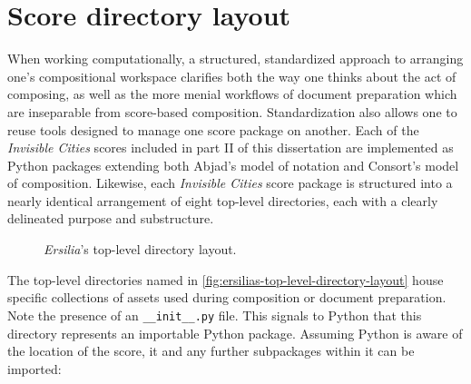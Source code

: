 \section{Score directory layout}

When working computationally, a structured, standardized approach to arranging
one's compositional workspace clarifies both the way one thinks about the act
of composing, as well as the more menial workflows of document preparation
which are inseparable from score-based composition. Standardization also allows
one to reuse tools designed to manage one score package on another. Each of the
\emph{Invisible Cities} scores included in part II of this dissertation are
implemented as Python packages extending both Abjad's model of notation and
Consort's model of composition. Likewise, each \emph{Invisible Cities} score
package is structured into a nearly identical arrangement of eight top-level
directories, each with a clearly delineated purpose and substructure.

\begin{figure}[h!]
\begin{singlespacing}
\vspace{-0.5\baselineskip}
\noindent%
\end{singlespacing}
\caption{\emph{Ersilia}'s top-level directory layout.}
\label{fig:ersilias-top-level-directory-layout}
\end{figure}

\noindent The top-level directories named in
\autoref{fig:ersilias-top-level-directory-layout} house specific collections
of assets used during composition or document preparation. Note the presence of
an \texttt{\_\_init\_\_.py} file. This signals to Python that this directory
represents an importable Python package. Assuming Python is aware of the
location of the score, it and any further subpackages within it can be
imported:

